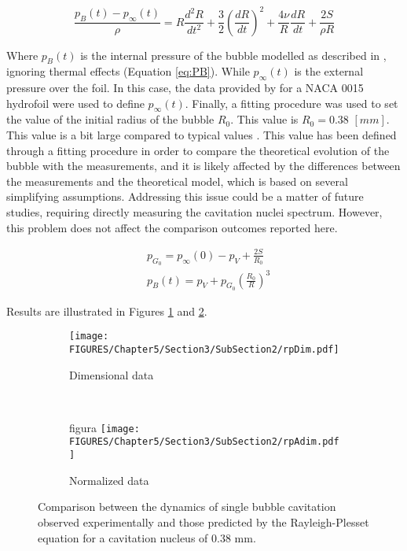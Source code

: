\begin{equation}
    \label{eq:RP}
    \frac{p_B(t) - p_\infty(t)}{\rho} = R \frac{d^2 R}{dt^2} + \frac{3}{2} \left( \frac{dR}{dt} \right)^2 + \frac{4 \nu}{R} \frac{dR}{dt} + \frac{2S}{\rho R}
\end{equation}

Where $p_B(t)$ is the internal pressure of the bubble modelled as described in \cite{brennen2014cavitation}, ignoring thermal effects (Equation \ref{eq:PB}). While $p_\infty(t)$ is the external pressure over the foil. In this case, the data provided by \cite{Abbott1945} for a NACA 0015 hydrofoil were used to define $p_\infty(t)$. Finally, a fitting procedure was used to set the value of the initial radius of the bubble $R_0$. This value is $R_0 = 0.38$ $[mm]$. This value is a bit large compared to typical values \cite{brennen2014cavitation}. This value has been defined through a fitting procedure in order to compare the theoretical evolution of the bubble with the measurements, and it is likely affected by the differences between the measurements and the theoretical model, which is based on several simplifying assumptions. Addressing this issue could be a matter of future studies, requiring directly measuring the cavitation nuclei spectrum. However, this problem does not affect the comparison outcomes reported here.

\begin{equation}
    \begin{aligned}
    &p_{G_0} = p_{\infty}(0) - p_V + \frac{2S}{R_0} \\[6pt]
    &p_B(t) = p_V + p_{G_0} \left(\frac{R_0}{R}\right)^3
    \end{aligned}
    \label{eq:PB}
\end{equation}

Results are illustrated in Figures \ref{fig:rpDim} and \ref{fig:rpAdim}. 

\begin{figure}[h!]
    \centering
    \begin{subfigure}[b]{\textwidth} 
        \centering
        \texttt{[image: FIGURES/Chapter5/Section3/SubSection2/rpDim.pdf]}
        \caption{Dimensional data}
        \label{fig:rpDim}
    \end{subfigure}
    \\ 
    \begin{subfigure}[b]{\textwidth} figura
        \centering
        \texttt{[image: FIGURES/Chapter5/Section3/SubSection2/rpAdim.pdf]}
        \caption{Normalized data}
        \label{fig:rpAdim}
    \end{subfigure}
    \caption{Comparison between the dynamics of single bubble cavitation observed experimentally and those predicted by the Rayleigh-Plesset equation for a cavitation nucleus of 0.38 mm.}
    \label{rpDynamics}
\end{figure}

